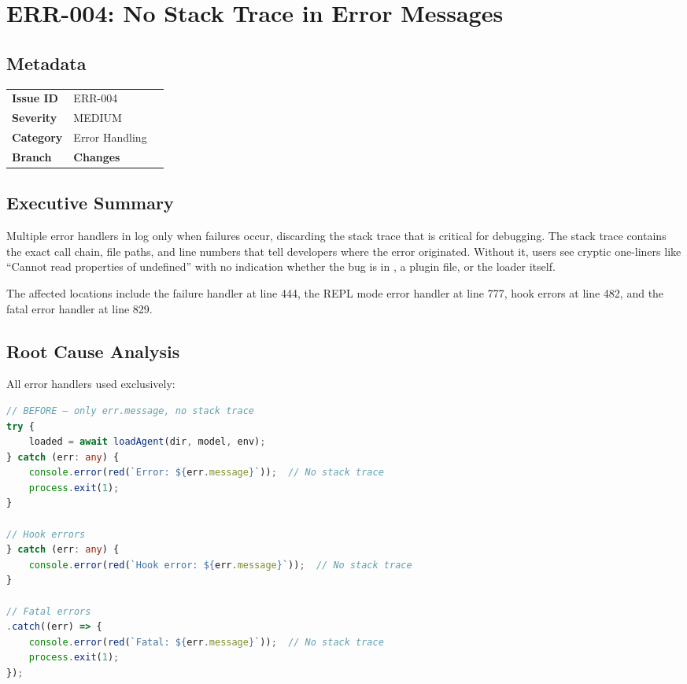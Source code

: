 \section{ERR-004: No Stack Trace in Error Messages}
\label{sec:err-004}
\subsection*{Metadata}
\begin{tabular}{ll}
\textbf{Issue ID} & ERR-004 \\
\textbf{Severity} & MEDIUM \\
\textbf{Category} & Error Handling \\
\textbf{Branch} & 
\textbf{Changes} &  \\
\end{tabular}

\subsection*{Executive Summary}
Multiple error handlers in  log only  when failures occur, discarding the stack trace that is critical for debugging. The stack trace contains the exact call chain, file paths, and line numbers that tell developers where the error originated. Without it, users see cryptic one-liners like ``Cannot read properties of undefined'' with no indication whether the bug is in , a plugin file, or the loader itself.

The affected locations include the  failure handler at line 444, the REPL mode error handler at line 777, hook errors at line 482, and the fatal error handler at line 829.

\subsection*{Root Cause Analysis}
All error handlers used  exclusively:

\begin{lstlisting}[language=TypeScript]
// BEFORE — only err.message, no stack trace
try {
    loaded = await loadAgent(dir, model, env);
} catch (err: any) {
    console.error(red(`Error: ${err.message}`));  // No stack trace
    process.exit(1);
}

// Hook errors
} catch (err: any) {
    console.error(red(`Hook error: ${err.message}`));  // No stack trace
}

// Fatal errors
.catch((err) => {
    console.error(red(`Fatal: ${err.message}`));  // No stack trace
    process.exit(1);
});
\end{lstlisting}

